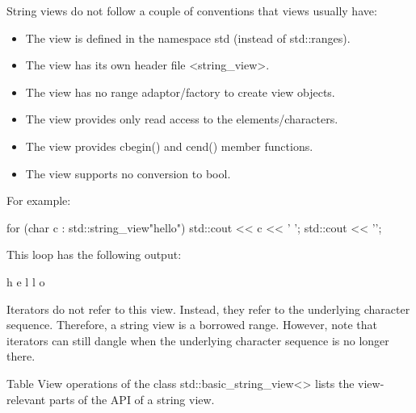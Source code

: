 String views do not follow a couple of conventions that views usually have:

\begin{itemize}
\item
The view is defined in the namespace std (instead of std::ranges).

\item
The view has its own header file <string\_view>.

\item
The view has no range adaptor/factory to create view objects.

\item
The view provides only read access to the elements/characters.

\item
The view provides cbegin() and cend() member functions.

\item
The view supports no conversion to bool.
\end{itemize}

For example:

\begin{cpp}
for (char c : std::string_view{"hello"}) {
	std::cout << c << ' ';
}
std::cout << '\n';
\end{cpp}

This loop has the following output:

\begin{shell}
h e l l o
\end{shell}


Iterators do not refer to this view. Instead, they refer to the underlying character sequence. Therefore, a string view is a borrowed range. However, note that iterators can still dangle when the underlying character sequence is no longer there.


Table View operations of the class std::basic\_string\_view<> lists the view-relevant parts of the API of a string view.


